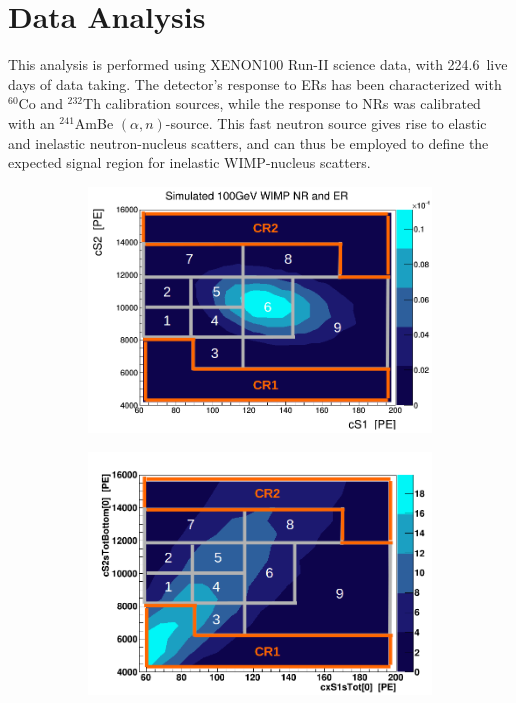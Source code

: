 \section{Data Analysis}
\label{sec:analysis}

This analysis is performed using XENON100 Run-II science data, with 224.6~live days of data taking. The detector's response to ERs has been characterized with $^{60}$Co and $^{232}$Th calibration sources, while the response to NRs was calibrated with an $^{241}$AmBe $(\alpha,n)$-source. This fast neutron source gives rise to elastic and inelastic neutron-nucleus scatters, and can thus be employed to define the expected signal region for inelastic WIMP-nucleus scatters.


\begin{figure}[t!]
	\begin{subfigure}{0.49\linewidth}
		\includegraphics[width=\linewidth]{images/wimp_in_sr.png}
		\subcaption{}
	\end{subfigure}
	\begin{subfigure}{0.49\linewidth}
		\includegraphics[width=\linewidth]{images/bkg_in_sr.png}

\end{subfigure}
\end{figure}

